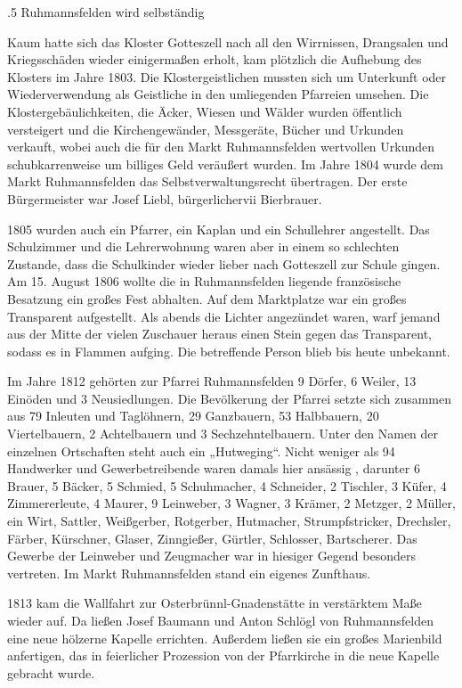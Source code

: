 .5 Ruhmannsfelden wird selbständig

Kaum hatte sich das Kloster Gotteszell nach all den Wirrnissen, Drangsalen und
Kriegsschäden wieder einigermaßen erholt, kam plötzlich die Aufhebung des
Klosters im Jahre 1803. Die Klostergeistlichen mussten sich um Unterkunft oder
Wiederverwendung als Geistliche in den umliegenden Pfarreien umsehen. Die
Klostergebäulichkeiten, die Äcker, Wiesen und Wälder wurden öffentlich
versteigert und die Kirchengewänder, Messgeräte, Bücher und Urkunden verkauft,
wobei auch die für den Markt Ruhmannsfelden wertvollen Urkunden schubkarrenweise
um billiges Geld veräußert wurden. Im Jahre 1804 wurde dem Markt Ruhmannsfelden
das Selbstverwaltungsrecht übertragen. Der erste Bürgermeister war Josef Liebl,
bürgerlichervii Bierbrauer.

1805 wurden auch ein Pfarrer, ein Kaplan und ein Schullehrer angestellt. Das
Schulzimmer und die Lehrerwohnung waren aber in einem so schlechten Zustande,
dass die Schulkinder wieder lieber nach Gotteszell zur Schule gingen. Am 15.
August 1806 wollte die in Ruhmannsfelden liegende französische Besatzung ein
großes Fest abhalten. Auf dem Marktplatze war ein großes Transparent
aufgestellt. Als abends die Lichter angezündet waren, warf jemand aus der Mitte
der vielen Zuschauer heraus einen Stein gegen das Transparent, sodass es in
Flammen aufging. Die betreffende Person blieb bis heute unbekannt.

Im Jahre 1812 gehörten zur Pfarrei Ruhmannsfelden 9 Dörfer, 6 Weiler, 13 Einöden
und 3 Neusiedlungen. Die Bevölkerung der Pfarrei setzte sich zusammen aus 79
Inleuten und Taglöhnern, 29 Ganzbauern, 53 Halbbauern, 20 Viertelbauern, 2
Achtelbauern und 3 Sechzehntelbauern. Unter den Namen der einzelnen Ortschaften
steht auch ein „Hutweging“. Nicht weniger als 94 Handwerker und Gewerbetreibende
waren damals hier ansässig , darunter 6 Brauer, 5 Bäcker, 5 Schmied, 5
Schuhmacher, 4 Schneider, 2 Tischler, 3 Küfer, 4 Zimmererleute, 4 Maurer, 9
Leinweber, 3 Wagner, 3 Krämer, 2 Metzger, 2 Müller, ein Wirt, Sattler,
Weißgerber, Rotgerber, Hutmacher, Strumpfstricker, Drechsler, Färber, Kürschner,
Glaser, Zinngießer, Gürtler, Schlosser, Bartscherer. Das Gewerbe der Leinweber
und Zeugmacher war in hiesiger Gegend besonders vertreten. Im Markt
Ruhmannsfelden stand ein eigenes Zunfthaus.

1813 kam die Wallfahrt zur Osterbrünnl-Gnadenstätte in verstärktem Maße wieder
auf. Da ließen Josef Baumann und Anton Schlögl von Ruhmannsfelden eine neue
hölzerne Kapelle errichten. Außerdem ließen sie ein großes Marienbild
anfertigen, das in feierlicher Prozession von der Pfarrkirche in die neue
Kapelle gebracht wurde.

